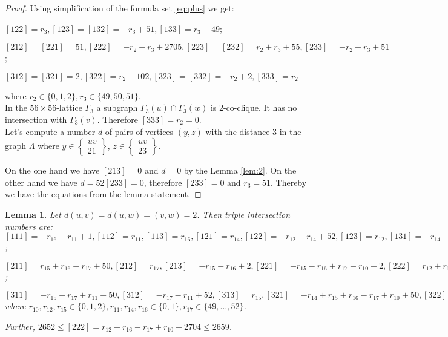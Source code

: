 \documentclass{article}
\newtheorem{lemma}{Lemma}
\theoremstyle{definition}
\theoremstyle{definition}
\theoremstyle{remark}
\begin{document}
\begin{proof} Using simplification of the formula set \ref{eq:plus} we get:

$[122] = r_3 , [123] = [132] = -r_3 + 51, [133] = r_3 - 49$;

$[212] = [221] = 51, [222] = -r_2 - r_3 + 2705, [223] = [232] = r_2 + r_3 + 55, [233] = -r_2 - r_3 + 51$;

$[312] = [321] = 2, [322] = r_2 + 102, [323] = [332] = -r_2 + 2, [333] = r_2$

where $r_2 \in \{0, 1, 2\}, r_3 \in \{49, 50, 51\}$. \\

In the $56 \times 56$-lattice $\Gamma_3$ a subgraph $\Gamma_3(u) \cap \Gamma_3(w)$ is 2-co-clique. It has no intersection with $\Gamma_3(v)$. Therefore $[333] = r_2 = 0$. \\

Let's compute a number $d$ of pairs of vertices $(y,z)$ with the distance $3$ in the graph $\Lambda$ where
 $y \in \begin{Bmatrix}uv \\ 2 1 \end{Bmatrix}$,
 $z \in \begin{Bmatrix}uv \\ 2 3 \end{Bmatrix}$.

On the one hand we have $[213] = 0$ and $d = 0$ by the Lemma \ref{lem:2}. On the other hand we have $ d = 52[233] = 0 $, therefore $[233] = 0$ and $r_3 = 51$. Thereby we have the equations from the lemma statement.
\end{proof}

\begin{lemma} Let $d(u, v) = d(u, w) = (v, w) = 2$. Then triple intersection numbers are: \\
$[111] = -r_{16} - r_{11} + 1, [112] = r_{11} , [113] = r_{16} , [121] = r_{14} , [122] = -r_{12} - r_{14} + 52, [123] = r_{12}, [131] = -r_{14} + r_{16} + r_{11} , [132] = r_{12} + r_{14} - r_{11} , [133] = -r_{12} - r_{16} + 2$;

$[211] = r_{15} + r_{16} - r_{17} + 50, [212] = r_{17} , [213] = -r_{15} - r_{16} + 2, [221] = -r_{15} - r_{16} + r_{17} - r_{10} + 2, [222] = r_{12} + r_{16} - r_{17} + r_{10} + 2704, [223] = -r_{12} + r_{15} + 104, [231] = r_{10} , [232] = -r_{12} - r_{16} - r_{10} + 106, [233] = r_{12} + r_{16}$;

$[311] = -r_{15} +r_{17} +r_{11} -50, [312] = -r_{17} -r_{11} +52, [313] = r_{15} , [321] = -r_{14} +r_{15} +r_{16} -r_{17} +r_{10} +50, [322] = r_{14} -r_{16} +r_{17} -r_{10} +54, [323] = -r_{15} +2, [331] = r_{14} -r_{16} -r_{10} -r_{11} +2, [332] = -r_{14} +r_{16} +r_{10} +r_{11}, [333] = 0$ \\

where $r_{10}, r_{12}, r_{15} \in \{0, 1, 2\}, r_{11} , r_{14} , r_{16} \in \{0, 1\}, r_{17} \in \{49, ..., 52\}$.

Further, $2652 \le [222] = r_{12} + r_{16} - r_{17} + r_{10} + 2704 \le 2659$.

\end{lemma}
\end{document}
